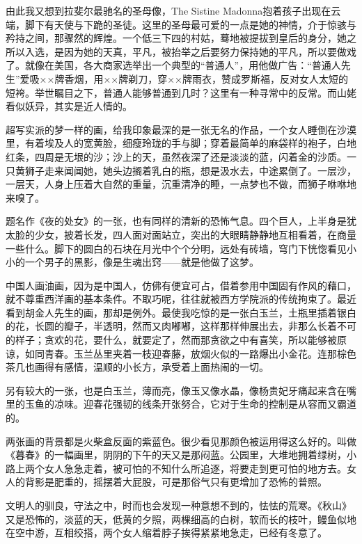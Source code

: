 \par 由此我又想到拉斐尔最驰名的圣母像，The Sistine Madonna抱着孩子出现在云端，脚下有天使与下跪的圣徒。这里的圣母最可爱的一点是她的神情，介于惊骇与矜持之间，那骤然的辉煌。一个低三下四的村姑，蓦地被提拔到皇后的身分，她之所以入选，是因为她的天真，平凡，被抬举之后要努力保持她的平凡，所以要做戏了。就像在美国，各大商家选举出一个典型的“普通人”，用他做广告：“普通人先生”爱吸××牌香烟，用××牌剃刀，穿××牌雨衣，赞成罗斯福，反对女人太短的短袴。举世瞩目之下，普通人能够普通到几时？这里有一种寻常中的反常。而山姥看似妖异，其实是近人情的。
\par 超写实派的梦一样的画，给我印象最深的是一张无名的作品，一个女人睡倒在沙漠里，有着埃及人的宽黄脸，细瘦玲珑的手与脚；穿着最简单的麻袋样的袍子，白地红条，四周是无垠的沙；沙上的天，虽然夜深了还是淡淡的蓝，闪着金的沙质。一只黄狮子走来闻闻她，她头边搁着乳白的瓶，想是汲水去，中途累倒了。一层沙，一层天，人身上压着大自然的重量，沉重清净的睡，一点梦也不做，而狮子咻咻地来嗅了。
\par 题名作《夜的处女》的一张，也有同样的清新的恐怖气息。四个巨人，上半身是犹太脸的少女，披着长发，四人面对面站立，突出的大眼睛静静地互相看着，在商量一些什么。脚下的圆白的石块在月光中个个分明，远处有砖墙，穹门下恍惚看见小小的一个男子的黑影，像是生魂出窍——就是他做了这梦。
\par 中国人画油画，因为是中国人，仿佛有便宜可占，借着参用中国固有作风的藉口，就不尊重西洋画的基本条件。不取巧呢，往往就被西方学院派的传统拘束了。最近看到胡金人先生的画，那却是例外。最使我吃惊的是一张白玉兰，土瓶里插着银白的花，长圆的瓣子，半透明，然而又肉嘟嘟，这样那样伸展出去，非那么长着不可的样子；贪欢的花，要什么，就要定了，然而那贪欲之中有喜笑，所以能够被原谅，如同青春。玉兰丛里夹着一枝迎春藤，放烟火似的一路爆出小金花。连那棕色茶几也画得有感情，温顺的小长方，承受着上面热闹的一切。
\par 另有较大的一张，也是白玉兰，薄而亮，像玉又像水晶，像杨贵妃牙痛起来含在嘴里的玉鱼的凉味。迎春花强韧的线条开张努合，它对于生命的控制是从容而又霸道的。
\par 两张画的背景都是火柴盒反面的紫蓝色。很少看见那颜色被运用得这么好的。叫做《暮春》的一幅画里，阴阴的下午的天又是那闷蓝。公园里，大堆地拥着绿树，小路上两个女人急急走着，被可怕的不知什么所追逐，将要走到更可怕的地方去。女人的背影是肥重的，摇摆着大屁股，可是那俗气只有更增加了恐怖的普照。
\par 文明人的驯良，守法之中，时而也会发现一种意想不到的，怯怯的荒寒。《秋山》又是恐怖的，淡蓝的天，低黄的夕照，两棵细高的白树，软而长的枝叶，鳗鱼似地在空中游，互相绞搭，两个女人缩着脖子挨得紧紧地急走，已经有冬意了。

